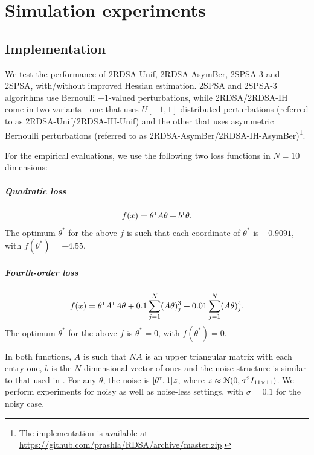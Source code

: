 \chapter{Simulation experiments}
\label{sec:expts}
\section{Implementation}
We test the performance of 2RDSA-Unif, 2RDSA-AsymBer, 2SPSA-3 and 2SPSA, with/without improved Hessian estimation. 
2SPSA and 2SPSA-3 algorithms use Bernoulli $\pm 1$-valued perturbations, while 2RDSA/2RDSA-IH come in two variants - one that uses $U[-1,1]$ distributed perturbations (referred to as 2RDSA-Unif/2RDSA-IH-Unif) and the other that uses asymmetric Bernoulli perturbations (referred to as 2RDSA-AsymBer/2RDSA-IH-AsymBer)\footnote{The implementation is available at \url{https://github.com/prashla/RDSA/archive/master.zip}.}.

For the empirical evaluations, we use the following two loss functions in $N=10$ dimensions:
\paragraph{Quadratic loss}
\begin{align}
f(x) = \theta^\mathsf{\scriptscriptstyle T} A \theta+ b^\mathsf{\scriptscriptstyle T} \theta.\label{eq:quadratic}
\end{align} 
The optimum $\theta^*$ for the above $f$ is such that each coordinate of $\theta^*$ is $-0.9091$, with $f(\theta^*) = -4.55$.

\paragraph{Fourth-order loss}
\begin{align} 
f(x) = \theta^\mathsf{\scriptscriptstyle T} A^\mathsf{\scriptscriptstyle T} A \theta + 0.1 \sum_{j=1}^N (A\theta)^3_j + 0.01 \sum_{j=1}^N (A\theta)^4_j.\label{eq:4thorder}
 \end{align} 
The optimum $\theta^*$ for the above $f$ is $\theta^*=0$, with $f(\theta^*) = 0$. 

In both functions, $A$ is such that $NA$ is an upper triangular matrix with each entry one, $b$ is the $N$-dimensional vector of ones and the noise structure is similar to that used in \cite{spall_adaptive}. For any $\theta$, the noise is $[\theta^\mathsf{\scriptscriptstyle T}, 1]z$, where $z \approx \mathcal{N}(0,\sigma^2 I_{11\times11})$. We perform experiments for noisy as well as noise-less settings, with $\sigma=0.1$ for the noisy case. 



